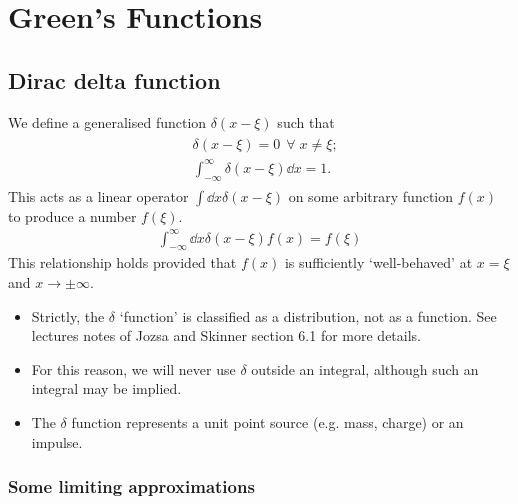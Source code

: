 \section{Green's Functions}

\subsection{Dirac delta function}
\begin{definition}
	We define a generalised function $\delta(x - \xi)$ such that
	\begin{align}
		\begin{aligned} \label{eq:6.1}
			&\delta(x-\xi) = 0 \ \ \forall \; x \neq \xi; \\
			&\int_{-\infty}^\infty \delta(x-\xi) \dd{x} = 1.
		\end{aligned} 	
	\end{align} 
	This acts as a linear operator $\int \dd{x} \delta(x - \xi)$ on some arbitrary function $f(x)$ to produce a number $f(\xi)$.
	\begin{align} \label{eq:6.2}
		\int_{-\infty}^\infty \dd{x} \delta(x-\xi) f(x) = f(\xi)
	\end{align}
	This relationship holds provided that $f(x)$ is sufficiently `well-behaved' at $x=\xi$ and $x\to\pm \infty$.
\end{definition}

\begin{note}
	\begin{itemize}
		\item Strictly, the $\delta$ `function' is classified as a distribution, not as a function.
		See lectures notes of Jozsa and Skinner section 6.1 for more details.
		\item For this reason, we will never use $\delta$ outside an integral, although such an integral may be implied.
		\item The $\delta$ function represents a unit point source (e.g. mass, charge) or an impulse.
	\end{itemize} 
\end{note}

\subsubsection{Some limiting approximations}

